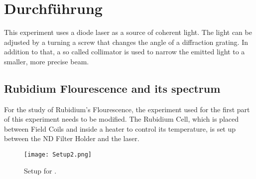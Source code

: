 \section{Durchführung}
\label{sec:Durchführung}

\label{sec:implementation}
This experiment uses a diode laser as a source of coherent light. The light can be adjusted by a turning a screw that changes the angle of a diffraction grating. 
In addition to that, a so called collimator is used to narrow the emitted light to a smaller, more precise beam. 


\subsection{Rubidium Flourescence and its spectrum}
\label{sec:Rubi}
For the study of Rubidium's Flourescence, the experiment used for the first part of this experiment needs to be modified.
The Rubidium Cell, which is placed between Field Coils and inside a heater to control its temperature, is set up between the ND Filter Holder and the laser.

\begin{wrapfigure}{r}{0.32\textwidth}
    \begin{center}
        \texttt{[image: Setup2.png]}
        \caption{Setup for \cite{ap60}.}
        \label{fig:Setup2}
    \end{center} 
\end{wrapfigure}